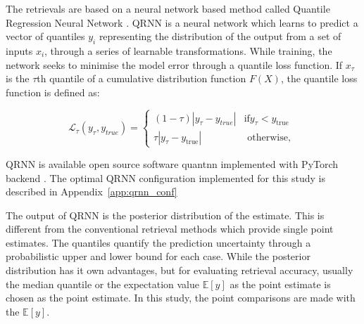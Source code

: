 \documentclass[amt, manuscript]{copernicus}
\begin{document}
The retrievals are based on a neural network based method called Quantile Regression Neural Network \citep[QRNN,][]{pfreundschuh:aneur:18}. QRNN is a neural network which learns to predict a vector of quantiles {$y_i$} representing the distribution of the output from a set of inputs {$x_i$}, through a series of learnable transformations. While training, the network seeks to minimise the model error through a quantile loss function. If $x_{\tau}$ is the $\tau$th quantile of a cumulative distribution function $F(X)$, the quantile loss function is defined as:

\begin{equation}
\mathcal{L}_\tau(y_\tau, y_{true}) = \begin{cases}
(1 - \tau)|y_\tau - y_{true}| & \text{if}  y_\tau < y_\text{true}\\
\tau |y_\tau - y_\text{true}| & \text{ otherwise, }
\end{cases}
\label{loss_function}
\end{equation}

QRNN is available open source software quantnn \citep{} implemented with PyTorch backend \citep{paszke2017automatic}. The optimal QRNN configuration implemented for this study is described in Appendix~\ref{app:qrnn_conf}

The output of QRNN is the posterior distribution of the estimate. This is different from the conventional retrieval methods which provide single point estimates. The quantiles quantify the prediction uncertainty through a probabilistic upper and lower bound for each case. While the posterior distribution has it own advantages, but for evaluating retrieval accuracy, usually the median quantile or the  expectation value $\mathbb{E}[y]$ as the point estimate is chosen as the point estimate. In this study, the point comparisons are made with the $\mathbb{E}[y]$. 
 

\end{document}
